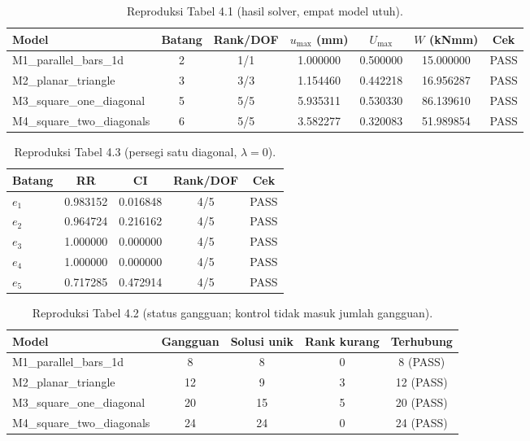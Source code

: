 
\begin{table}[htbp]\centering
\caption{Reproduksi Tabel 4.1 (hasil solver, empat model utuh).}
\label{tab:repro41}
\begin{tabular}{lcccccc}\hline
Model & Batang & Rank/DOF & $u_{\max}$ (mm) & $U_{\max}$ & $W$ (kNmm) & Cek \\\hline
M1_parallel_bars_1d & 2 & 1/1 & 1.000000 & 0.500000 & 15.000000 & PASS \\
M2_planar_triangle & 3 & 3/3 & 1.154460 & 0.442218 & 16.956287 & PASS \\
M3_square_one_diagonal & 5 & 5/5 & 5.935311 & 0.530330 & 86.139610 & PASS \\
M4_square_two_diagonals & 6 & 5/5 & 3.582277 & 0.320083 & 51.989854 & PASS \\
\hline\end{tabular}\end{table}

\begin{table}[htbp]\centering
\caption{Reproduksi Tabel 4.3 (persegi satu diagonal, $\lambda=0$).}
\label{tab:repro43}
\begin{tabular}{lcccc}\hline
Batang & RR & CI & Rank/DOF & Cek \\\hline
$e_1$ & 0.983152 & 0.016848 & 4/5 & PASS \\
$e_2$ & 0.964724 & 0.216162 & 4/5 & PASS \\
$e_3$ & 1.000000 & 0.000000 & 4/5 & PASS \\
$e_4$ & 1.000000 & 0.000000 & 4/5 & PASS \\
$e_5$ & 0.717285 & 0.472914 & 4/5 & PASS \\
\hline\end{tabular}\end{table}

\begin{table}[htbp]\centering
\caption{Reproduksi Tabel 4.2 (status gangguan; kontrol tidak masuk jumlah gangguan).}
\label{tab:repro42}
\begin{tabular}{lcccc}\hline
Model & Gangguan & Solusi unik & Rank kurang & Terhubung \\\hline
M1_parallel_bars_1d & 8 & 8 & 0 & 8 (PASS) \\
M2_planar_triangle & 12 & 9 & 3 & 12 (PASS) \\
M3_square_one_diagonal & 20 & 15 & 5 & 20 (PASS) \\
M4_square_two_diagonals & 24 & 24 & 0 & 24 (PASS) \\
\hline\end{tabular}\end{table}

